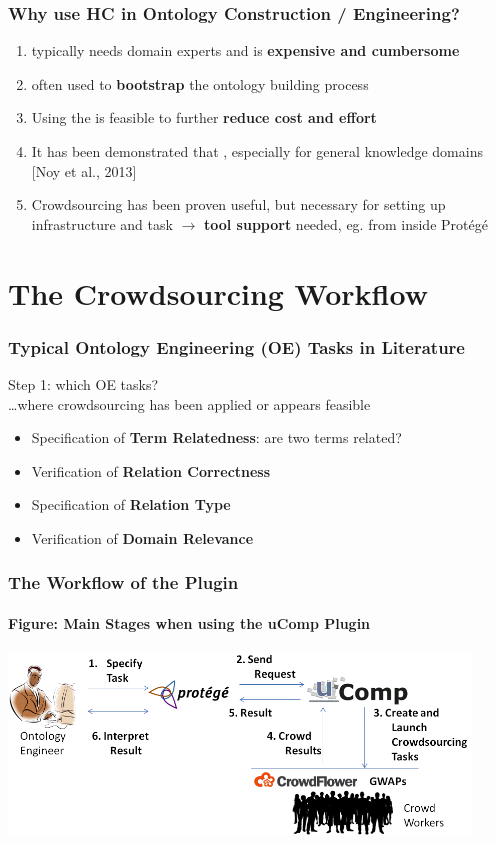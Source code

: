 \documentclass{beamer}
\begin{document}
\begin{frame}
  \frametitle{Why use HC in Ontology Construction / Engineering?}
  \begin{enumerate}
    \item {} typically needs domain experts and is \textbf{expensive and cumbersome}
    \item {} often used to \textbf{bootstrap} the ontology building process 
    \item Using the  is feasible to further \textbf{reduce cost and effort}
    \item It has been demonstrated that , especially for general knowledge domains [Noy et al., 2013] %
    \item Crowdsourcing has been proven useful, but  necessary for setting up infrastructure and task $\rightarrow{}$ \textbf{tool support} needed, eg. from inside Prot\'eg\'e
  \end{enumerate}
\end{frame}


\section{The Crowdsourcing Workflow}

\begin{frame}
  \frametitle{Typical Ontology Engineering (OE) Tasks in Literature}
    \huge Step 1: which OE tasks? \\ \large
    \vspace{0.5cm}
    \dots where crowdsourcing has been applied or appears feasible
    \vspace{0.2cm}
  \begin{itemize}
    \item Specification of \textbf{Term Relatedness}: are two terms related?
    \item Verification of \textbf{Relation Correctness}
    \item Specification of \textbf{Relation Type}
    \item Verification of \textbf{Domain Relevance}
  \end{itemize}
\end{frame}


\begin{frame}
  \frametitle{The Workflow of the Plugin}
  \framesubtitle{Figure: Main Stages when using the uComp Plugin}
   \center
  \includegraphics[height=1.9in]{images/process}
\end{frame}
\end{document}
